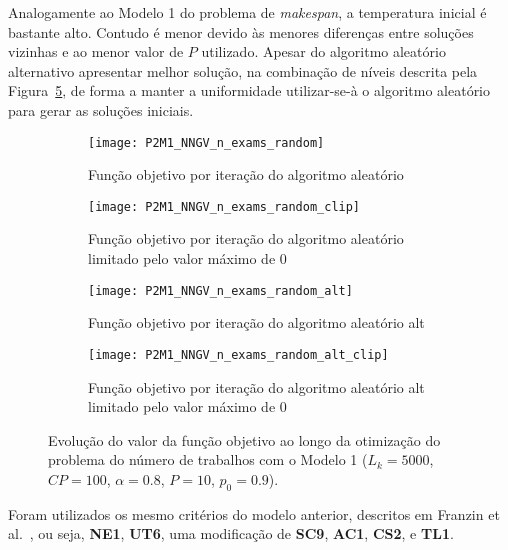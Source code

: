 Analogamente ao Modelo 1 do problema de \textit{makespan}, a temperatura inicial é bastante alto. Contudo é menor devido às menores diferenças entre soluções vizinhas e ao menor valor de $P$ utilizado. Apesar do algoritmo aleatório alternativo apresentar melhor solução, na combinação de níveis descrita pela Figura~\ref{fig:P2M1_NNGV_dif_sol_ini}, de forma a manter a uniformidade utilizar-se-à o algoritmo aleatório para gerar as soluções iniciais.\\
\begin{figure}[H]
    \centering
    \begin{subfigure}{0.49\textwidth}
        \centering
        \texttt{[image: P2M1\_NNGV\_n\_exams\_random]}
        \caption{Função objetivo por iteração do algoritmo aleatório}
        \label{fig:P2M1_NNGV_n_exams_random}
    \end{subfigure}
    \hfill
    \begin{subfigure}{0.49\textwidth}
        \centering
        \texttt{[image: P2M1\_NNGV\_n\_exams\_random\_clip]}
        \caption{Função objetivo por iteração do algoritmo aleatório limitado pelo valor máximo de 0}
        \label{fig:P2M1_NNGV_n_exams_random_clip}
    \end{subfigure}
    
    \begin{subfigure}{0.49\textwidth}
        \centering
        \texttt{[image: P2M1\_NNGV\_n\_exams\_random\_alt]}
        \caption{Função objetivo por iteração do algoritmo aleatório alt}
        \label{fig:P2M1_NNGV_n_exams_random_alt}
    \end{subfigure}
    \hfill
    \begin{subfigure}{0.49\textwidth}
        \centering
        \texttt{[image: P2M1\_NNGV\_n\_exams\_random\_alt\_clip]}
        \caption{Função objetivo por iteração do algoritmo aleatório alt limitado pelo valor máximo de 0}
        \label{fig:P2M1_NNGV_n_exams_random_alt_clip}
    \end{subfigure}
    \caption{Evolução do valor da função objetivo ao longo da otimização do problema do número de trabalhos com o Modelo 1 ($L_{k}=5000$, $CP=100$, $\alpha=0.8$, $P=10$, $p_{0}=0.9$).}
    \label{fig:P2M1_NNGV_dif_sol_ini}
\end{figure}

Foram utilizados os mesmo critérios do modelo anterior, descritos em Franzin et al.~\cite{franzinRevisitingSimulatedAnnealing2019}, ou seja, \textbf{NE1}, \textbf{UT6}, uma modificação de \textbf{SC9}, \textbf{AC1}, \textbf{CS2}, e \textbf{TL1}.\\

